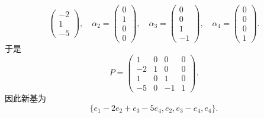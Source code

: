 \documentclass[../../main.tex]{subfiles}%
\begin{document}
\begin{solution}
\[\begin{pmatrix}
-2 \\
1 \\
-5
\end{pmatrix}, \quad \alpha_2 = \begin{pmatrix}
0 \\
1 \\
0 \\
0
\end{pmatrix}, \quad \alpha_3 = \begin{pmatrix}
0 \\
0 \\
1 \\
-1
\end{pmatrix}, \quad \alpha_4 = \begin{pmatrix}
0 \\
0 \\
0 \\
1
\end{pmatrix}.
\]
于是
\[
P = \begin{pmatrix}
1 & 0 & 0 & 0 \\
-2 & 1 & 0 & 0 \\
1 & 0 & 1 & 0 \\
-5 & 0 & -1 & 1
\end{pmatrix}.
\]
因此新基为
\[
\{e_1 - 2e_2 + e_3 - 5e_4, e_2, e_3 - e_4, e_4\}.
\] 

\end{solution}
\end{document}
